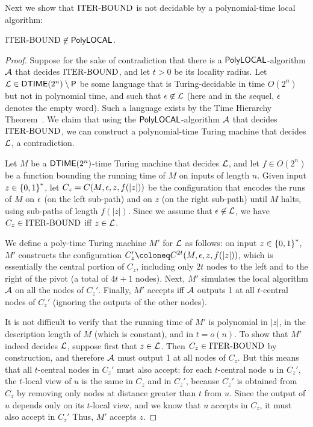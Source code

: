 Next we show that ${\mathrm{ITER\text{-}BOUND}}$ is not decidable by a polynomial-time local algorithm:

\begin{claim}\label{claimITINLDP}
	${\mathrm{ITER\text{-}BOUND}} \not \in {\mathsf{PolyLOCAL}}$.
\end{claim}
\begin{proof}
Suppose for the sake of contradiction that there is a ${\mathsf{PolyLOCAL}}$-algorithm ${\mathcal{A}}$ that decides ${\mathrm{ITER\text{-}BOUND}}$,
and let $t > 0 $ be its locality radius.
Let $\mathcal{L} \in {\mathsf{DTIME}}(2^{n}) \setminus {\mathsf{P}}$ be some language that is Turing-decidable
in time $O(2^{n})$ but not in polynomial time,
and such that $\epsilon \not \in \mathcal{L}$ (here and in the sequel, $\epsilon$ denotes the empty word).
Such a language exists by the Time Hierarchy Theorem~\cite{hartmanis1965computational}.
We claim that using the ${\mathsf{PolyLOCAL}}$-algorithm ${\mathcal{A}}$ that decides ${\mathrm{ITER\text{-}BOUND}}$, we can construct a polynomial-time Turing machine
that decides $\mathcal{L}$, a contradiction.

Let $M$ be a ${\mathsf{DTIME}}(2^{n})$-time Turing machine that decides $\mathcal{L}$,
and let $f \in O(2^n)$ be a function bounding the running time of $M$ on inputs of length $n$.
Given input $z \in \left \{{0,1} \right \}^*$,
let $C_z = C(M,\epsilon,z,f(|z|))$
be the configuration that encodes the runs of $M$ on $\epsilon$ (on the left sub-path) and on $z$
(on the right sub-path)
until $M$ halts, using sub-paths of length $f(|z|)$.
Since we assume that $\epsilon \not \in \mathcal{L}$,
we have $C_z \in {\mathrm{ITER\text{-}BOUND}}$ iff $z \in \mathcal{L}$.

We define a poly-time Turing machine $M'$ for $\mathcal{L}$ as follows:
on input $z \in \left \{{0,1} \right \}^*$,
$M'$ constructs the configuration $C_z' \coloneq C^{2t}(M, \eps, z, f(|z|))$,
which is essentially the central portion of $C_z$, including only $2t$ 
nodes to the left and to the right of the pivot (a total of $4t+1$ nodes).
Next, $M'$ simulates the local algorithm ${\mathcal{A}}$
on all the nodes of $C_z'$.
Finally, $M'$ accepts iff ${\mathcal{A}}$ outputs 1 at all $t$-central nodes of $C_z'$
(ignoring the outputs of the other nodes).

It is not difficult to verify that the running time of $M'$ is polynomial in $|z|$,
in the description length of $M$ (which is constant),
and in $t = o(n)$.
To show that $M'$ indeed decides $\mathcal{L}$,
suppose first that $z \in \mathcal{L}$.
Then $C_z \in {\mathrm{ITER\text{-}BOUND}}$ by construction,
and therefore ${\mathcal{A}}$ must output 1 at all nodes of $C_z$.
But this means that all $t$-central nodes in $C_z'$ must also accept:
for each $t$-central node $u$ in $C_z'$,
the $t$-local view of $u$ is the same in $C_z$ and in $C_z'$,
because $C_z'$ is obtained from $C_z$ by removing only nodes at distance greater than $t$ from $u$.
Since the output of $u$ depends only on its $t$-local view,
and we know that $u$ accepts in $C_z$, it must also accept in $C_z'$
Thus, $M'$ accepts $z$.


\end{proof}
